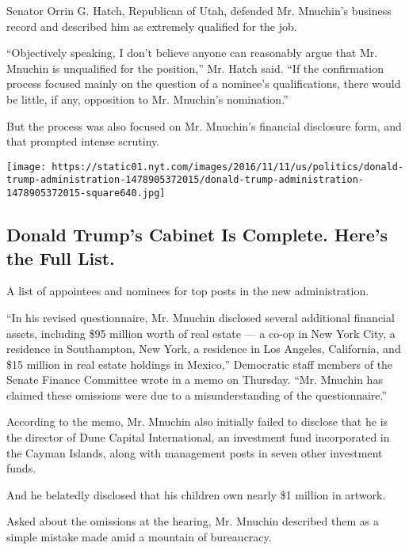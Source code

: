 Senator Orrin G. Hatch, Republican of Utah, defended Mr. Mnuchin's
business record and described him as extremely qualified for the job.

``Objectively speaking, I don't believe anyone can reasonably argue that
Mr. Mnuchin is unqualified for the position,'' Mr. Hatch said. ``If the
confirmation process focused mainly on the question of a nominee's
qualifications, there would be little, if any, opposition to Mr.
Mnuchin's nomination.''

But the process was also focused on Mr. Mnuchin's financial disclosure
form, and that prompted intense scrutiny.

\href{https://www.nytimes.com/interactive/2016/us/politics/donald-trump-administration.html}{}

\texttt{[image: https://static01.nyt.com/images/2016/11/11/us/politics/donald-trump-administration-1478905372015/donald-trump-administration-1478905372015-square640.jpg]}

\hypertarget{donald-trumps-cabinet-is-complete-heres-the-full-list}{%
\subsection{Donald Trump's Cabinet Is Complete. Here's the Full
List.}\label{donald-trumps-cabinet-is-complete-heres-the-full-list}}

A list of appointees and nominees for top posts in the new
administration.

``In his revised questionnaire, Mr. Mnuchin disclosed several additional
financial assets, including \$95 million worth of real estate --- a
co-op in New York City, a residence in Southampton, New York, a
residence in Los Angeles, California, and \$15 million in real estate
holdings in Mexico,'' Democratic staff members of the Senate Finance
Committee wrote in a memo on Thursday. ``Mr. Mnuchin has claimed these
omissions were due to a misunderstanding of the questionnaire.''

According to the memo, Mr. Mnuchin also initially failed to disclose
that he is the director of Dune Capital International, an investment
fund incorporated in the Cayman Islands, along with management posts in
seven other investment funds.

And he belatedly disclosed that his children own nearly \$1 million in
artwork.

Asked about the omissions at the hearing, Mr. Mnuchin described them as
a simple mistake made amid a mountain of bureaucracy.

